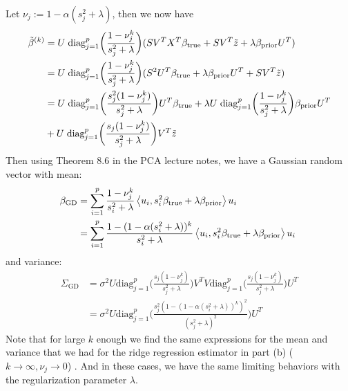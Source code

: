 \documentclass[12pt,twoside]{article}
\begin{document}
\begin{enumerate}
\begin{enumerate}
Let $\nu_j := 1 - \alpha (s_j^2 + \lambda)$, then we now have
\begin{align*}
	\tilde{ \beta }^{(k)} 	&= 	 U \;    \text{diag}_{j=1}^p \bigg(  \frac{ 1 - \nu_j^k} {s_j^2 + \lambda}  \bigg) (S V^T X^T  \beta_{\operatorname{true}}  + S V^T  \tilde{ z } +  \lambda \beta_{\operatorname{prior}}  U^T)\\
					&=	 U \;    \text{diag}_{j=1}^p \bigg(  \frac{ 1 - \nu_j^k} {s_j^2 + \lambda}  \bigg) (S^2 U^T  \beta_{\operatorname{true}}  +  \lambda \beta_{\operatorname{prior}}  U^T  + S V^T  \tilde{ z }) \\	
					&=	 U \;    \text{diag}_{j=1}^p \bigg(  \frac{s_j^2  (1 - \nu_j^k)} {s_j^2 + \lambda} \bigg) U^T \beta_{\operatorname{true}}  + \lambda U \;    \text{diag}_{j=1}^p \bigg(  \frac{1 - \nu_j^k} {s_j^2 + \lambda} \bigg) \beta_{\operatorname{prior}} U^T \\
					&+  	 U \;    \text{diag}_{j=1}^p \bigg(  \frac{ s_j  (1 - \nu_j^k)} {s_j^2 + \lambda} \bigg) V^T  \tilde{ z } 
\end{align*}	
 Then using Theorem 8.6 in the PCA lecture notes, we have a Gaussian random vector  with mean:
\begin{align*}
	\beta_{\text{GD}} 	&= \sum_{i=1}^p \frac{1 - \nu_j^k}{s_i^2 + \lambda} \left \langle u_i, s_i^2 \beta_{\operatorname{true}}+ \lambda  \beta_{\operatorname{prior}} \right \rangle u_i \\
					&= \sum_{i=1}^p \frac{1 - (1 - \alpha (s_i^2 + \lambda))^k} {s_i^2 + \lambda} \left \langle u_i, s_i^2 \beta_{\operatorname{true}}+ \lambda  \beta_{\operatorname{prior}} \right \rangle u_i \
\end{align*}
and variance:
\begin{align*} 
	\Sigma_{\text{GD}}			&= \sigma^2 U  \text{diag}_{j=1}^p \bigg(  \frac{ s_j  (1 - \nu_j^k)} {s_j^2 + \lambda} \bigg) V^T V  \text{diag}_{j=1}^p \bigg(  \frac{ s_j  (1 - \nu_j^k)} {s_j^2 + \lambda} \bigg) U^T \\
							&= \sigma^2 U  \text{diag}_{j=1}^p \bigg(  \frac{ s_j^2  (1 - (1 - \alpha (s_i^2 + \lambda))^k)^2} {(s_j^2 + \lambda)^2} \bigg) U^T
\end{align*}
 Note that for large $k$ enough we find the same expressions for the mean and variance that we had  for the ridge regression estimator in part (b) ($k \rightarrow \infty, \nu_j \rightarrow 0$) .
 And in these cases, we have the same limiting behaviors with the regularization parameter $\lambda$. 
 
 \end{enumerate}
 

\end{enumerate}
\end{document}
